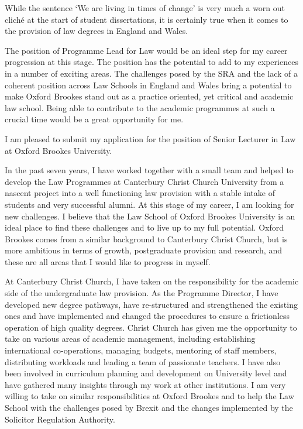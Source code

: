 \documentclass[11pt,a4paper]{moderncv}
\begin{document}
While the sentence `We are living in times of change' is very much a worn out clich\'e at the start of student dissertations, it is certainly true when it comes to the provision of law degrees in England and Wales. 

The position of Programme Lead for Law would be an ideal step for my career progression at this stage. The position has the potential to add to my experiences in a number of exciting areas. The challenges posed by the SRA and the lack of a coherent position across Law Schools in England and Wales bring a potential to make Oxford Brookes stand out as a practice oriented, yet critical and academic law school. Being able to contribute to the academic programmes at such a crucial time would be a great opportunity for me.


I am pleased to submit my application for the position of Senior Lecturer in Law at Oxford Brookes University.

In the past seven years, I have worked together with a small team and helped to develop the Law Programmes at Canterbury Christ Church University from a nascent project into a well functioning law provision with a stable intake of students and very successful alumni. At this stage of my career, I am looking for new challenges. I believe that the Law School of Oxford Brookes University is an ideal place to find these challenges and to live up to my full potential. Oxford Brookes comes from a similar background to Canterbury Christ Church, but is more ambitious in terms of growth, postgraduate provision and research, and these are all areas that I would like to progress in myself.

At Canterbury Christ Church, I have taken on the responsibility for the academic side of the undergraduate law provision. As the Programme Director, I have developed new degree pathways, have re-structured and strengthened the existing ones and have implemented and changed the procedures to ensure a frictionless operation of high quality degrees. Christ Church has given me the opportunity to take on various areas of academic management, including establishing international co-operations, managing budgets, mentoring of staff members, distributing workloads and leading a team of passionate teachers. I have also been involved in curriculum planning and development on University level and have gathered many insights through my work at other institutions. I am very willing to take on similar responsibilities at Oxford Brookes and to help the Law School with the challenges posed by Brexit and the changes implemented by the Solicitor Regulation Authority.
\end{document}
